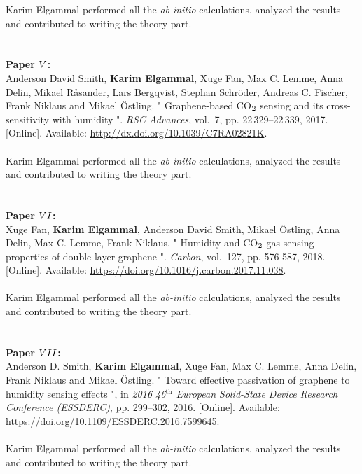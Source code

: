 Karim Elgammal performed all the \textit{ab-initio} calculations, analyzed the results and contributed to writing the theory part.
\\ \\ \\
\textbf{Paper $\Rmnum{5}$: \label{P5}} \\          %
Anderson David Smith, \textbf{Karim Elgammal}, Xuge Fan, Max C. Lemme, Anna Delin, Mikael Råsander, Lars Bergqvist, Stephan Schröder, Andreas C. Fischer, Frank Niklaus and Mikael {\"{O}}stling. " Graphene-based CO$_{\textrm 2}$ sensing and its cross-sensitivity with humidity ". \emph{RSC Advances}, vol.~7, pp. 22\,329--22\,339, 2017. [Online]. Available: \url{http://dx.doi.org/10.1039/C7RA02821K}.\\ \\
Karim Elgammal performed all the \textit{ab-initio} calculations, analyzed the results and contributed to writing the theory part.
\\ \\ \\
\textbf{Paper $\Rmnum{6}$: \label{P6}} \\          %
Xuge Fan, \textbf{Karim Elgammal}, Anderson David Smith, Mikael {\"{O}}stling, Anna Delin, Max C. Lemme, Frank Niklaus. " Humidity and CO$_{\textrm 2}$ gas sensing properties of double-layer graphene ". \emph{Carbon}, vol.~127, pp. 576-587, 2018. [Online]. Available: \url{https://doi.org/10.1016/j.carbon.2017.11.038}.\\ \\
Karim Elgammal performed all the \textit{ab-initio} calculations, analyzed the results and contributed to writing the theory part.
\\ \\ \\ 
\textbf{Paper $\Rmnum{7}$: \label{P7}} \\          %
Anderson D. Smith, \textbf{Karim Elgammal}, Xuge Fan, Max C. Lemme, Anna Delin, Frank Niklaus and Mikael Östling. " Toward effective passivation of graphene to humidity sensing effects ", in \emph{2016 46$^{\textrm {th}}$ European Solid-State Device Research Conference (ESSDERC)}, pp. 299--302, 2016. [Online]. Available: \url{https://doi.org/10.1109/ESSDERC.2016.7599645}. \\ \\
Karim Elgammal performed all the \textit{ab-initio} calculations, analyzed the results and contributed to writing the theory part.
\endinput